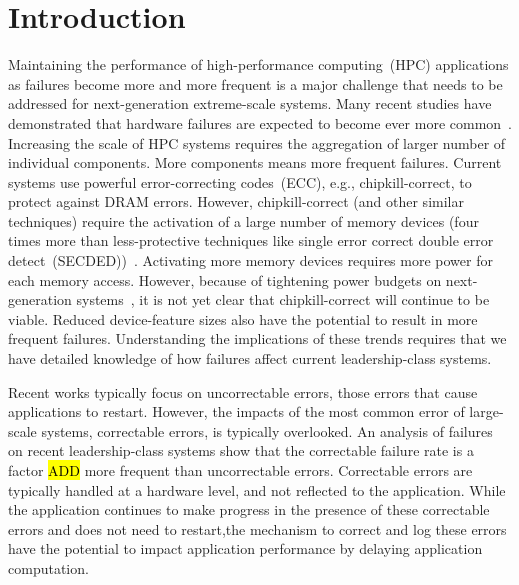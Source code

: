 
\section{Introduction}
\label{sec:intro}

Maintaining the performance of high-performance computing~(HPC) applications as
failures become more and more frequent is a major challenge that needs to be
addressed for next-generation extreme-scale systems.  Many recent studies have
demonstrated that hardware failures are expected to become ever more
common~\cite{Bergman08exascalecomputing}.  Increasing the scale of HPC systems
requires the aggregation of larger number of individual components.  More
components means more frequent failures.  Current systems use powerful
error-correcting codes~(ECC), e.g., chipkill-correct, to protect against DRAM
errors.  However, chipkill-correct (and other similar techniques) require the
activation of a large number of memory devices (four times more than
less-protective techniques like single error correct double error
detect~(SECDED))~\cite{Jian13}.  Activating more memory devices requires more
power for each memory access.  However, because of tightening power budgets on
next-generation systems~\cite{Bergman08exascalecomputing}, it is not yet clear
that chipkill-correct will continue to be viable.  Reduced device-feature sizes
also have the potential to result in more frequent failures.  Understanding the
implications of these trends requires that we have detailed knowledge of how
failures affect current leadership-class systems.

Recent works typically focus on uncorrectable errors, those errors that cause
applications to restart.  However, the impacts of the most common error of
large-scale systems, correctable errors, is typically overlooked. An analysis of
failures on recent leadership-class systems show that the correctable failure
rate is a factor \hl{ADD} more frequent than uncorrectable errors.  Correctable
errors are typically handled at a hardware level, and not reflected to the
application.  While the application continues to make progress in the presence
of these correctable errors and does not need to restart,the mechanism to
correct and log these errors have the potential to impact application
performance by delaying application computation.


\label{fig:propagation}

